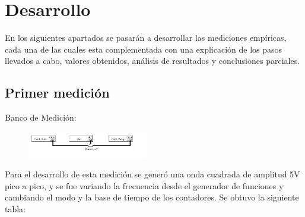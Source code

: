 \documentclass{article}
\begin{document}
\section{Desarrollo}

	En los siguientes apartados se pasarán a desarrollar las mediciones empíricas, cada una de las cuales esta complementada con una explicación de los pasos llevados a cabo, valores obtenidos, análisis de resultados y conclusiones parciales.
\bigskip






\subsection{Primer medición}
	
	Banco de Medición:
	
	\begin{figure}[h]
				\centering
				\includegraphics[width=0.47\textwidth]{images/bancoMedicion.jpg}
				\medskip
	\end{figure}
	\bigskip\bigskip	

	Para el desarrollo de esta medición se generó una onda cuadrada de amplitud 5V pico a pico, y se fue variando la frecuencia desde el generador de funciones y cambiando el modo y la base de tiempo de los contadores. Se obtuvo la siguiente tabla:
\end{document}
